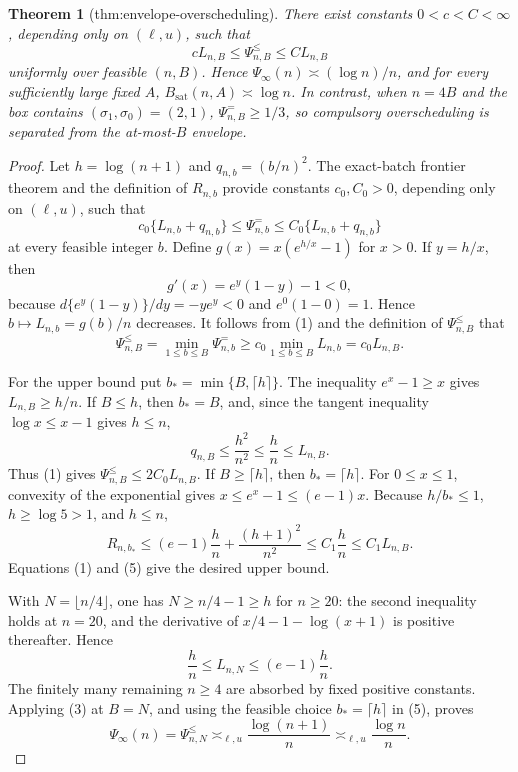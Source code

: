 \documentclass{article}
\newtheorem{theorem}{Theorem}
\begin{document}
\begin{theorem}[thm:envelope-overscheduling]\label{thm:envelope-overscheduling}
There exist constants \(0<c<C<\infty\), depending only on \((\ell,u)\), such that \[cL_{n,B}\le\Psi^{\le}_{n,B}\le CL_{n,B}\] uniformly over feasible \((n,B)\). Hence \(\Psi_\infty(n)\asymp(\log n)/n\), and for every sufficiently large fixed \(A\), \(B_{\mathrm{sat}}(n,A)\asymp\log n\). In contrast, when \(n=4B\) and the box contains \((\sigma_1,\sigma_0)=(2,1)\), \(\Psi^{=}_{n,B}\ge1/3\), so compulsory overscheduling is separated from the at-most-\(B\) envelope.
\end{theorem}
\begin{proof}
Let \(h=\log(n+1)\) and \(q_{n,b}=(b/n)^2\). The exact-batch frontier theorem and the definition of \(R_{n,b}\) provide constants \(c_0,C_0>0\), depending only on \((\ell,u)\), such that
\[
c_0\{L_{n,b}+q_{n,b}\}\leq\Psi^{=}_{n,b}
\leq C_0\{L_{n,b}+q_{n,b}\}                       \tag{1}
\]
at every feasible integer \(b\). Define \(g(x)=x(e^{h/x}-1)\) for \(x>0\). If \(y=h/x\), then
\[
g'(x)=e^y(1-y)-1<0,                                 \tag{2}
\]
because \(d\{e^y(1-y)\}/dy=-ye^y<0\) and \(e^0(1-0)=1\). Hence \(b\mapsto L_{n,b}=g(b)/n\) decreases. It follows from (1) and the definition of \(\Psi^{\leq}_{n,B}\) that
\[
\Psi^{\leq}_{n,B}
=\min_{1\leq b\leq B}\Psi^{=}_{n,b}
\geq c_0\min_{1\leq b\leq B}L_{n,b}
=c_0L_{n,B}.                                        \tag{3}
\]

For the upper bound put \(b_*=\min\{B,\lceil h\rceil\}\). The inequality \(e^x-1\geq x\) gives \(L_{n,B}\geq h/n\). If \(B\leq h\), then \(b_*=B\), and, since the tangent inequality \(\log x\leq x-1\) gives \(h\leq n\),
\[
q_{n,B}\leq\frac{h^2}{n^2}\leq\frac{h}{n}\leq L_{n,B}. \tag{4}
\]
Thus (1) gives \(\Psi^{\leq}_{n,B}\leq2C_0L_{n,B}\). If \(B\geq\lceil h\rceil\), then \(b_*=\lceil h\rceil\). For \(0\leq x\leq1\), convexity of the exponential gives
\(x\leq e^x-1\leq(e-1)x\). Because \(h/b_*\leq1\), \(h\geq\log5>1\), and \(h\leq n\),
\[
R_{n,b_*}
\leq(e-1)\frac{h}{n}+\frac{(h+1)^2}{n^2}
\leq C_1\frac{h}{n}
\leq C_1L_{n,B}.                                    \tag{5}
\]
Equations (1) and (5) give the desired upper bound.

With \(N=\lfloor n/4\rfloor\), one has \(N\geq n/4-1\geq h\) for \(n\geq20\): the second inequality holds at \(n=20\), and the derivative of \(x/4-1-\log(x+1)\) is positive thereafter. Hence
\[
\frac{h}{n}\leq L_{n,N}\leq(e-1)\frac{h}{n}.       \tag{6}
\]
The finitely many remaining \(n\geq4\) are absorbed by fixed positive constants. Applying (3) at \(B=N\), and using the feasible choice \(b_*=\lceil h\rceil\) in (5), proves
\[
\Psi_\infty(n)=\Psi^{\leq}_{n,N}
\asymp_{\ell,u}\frac{\log(n+1)}{n}
\asymp_{\ell,u}\frac{\log n}{n}.                  \tag{7}
\]


\end{proof}
\end{document}
